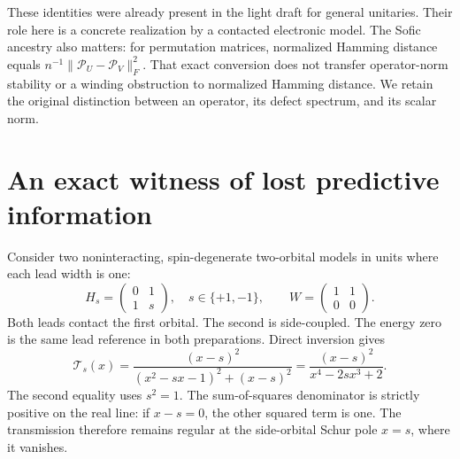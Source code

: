 \documentclass[11pt]{article}
\begin{document}
These identities were already present in the light draft for general unitaries. Their role here is a concrete realization by a contacted electronic model. The Sofic ancestry also matters: for permutation matrices, normalized Hamming distance equals $n^{-1}\|\mathcal P_U-\mathcal P_V\|_F^2$. That exact conversion does not transfer operator-norm stability or a winding obstruction to normalized Hamming distance. We retain the original distinction between an operator, its defect spectrum, and its scalar norm.

\section{An exact witness of lost predictive information}
Consider two noninteracting, spin-degenerate two-orbital models in units where each lead width is one:
\begin{equation}
H_s=\begin{pmatrix}0&1\\1&s\end{pmatrix},\quad s\in\{+1,-1\},\qquad
W=\begin{pmatrix}1&1\\0&0\end{pmatrix}.
\label{eq:twins}
\end{equation}
Both leads contact the first orbital. The second is side-coupled. The energy zero is the same lead reference in both preparations. Direct inversion gives
\begin{equation}
\mathcal T_s(x)=\frac{(x-s)^2}{(x^2-sx-1)^2+(x-s)^2}
=\frac{(x-s)^2}{x^4-2sx^3+2}.
\label{eq:twinT}
\end{equation}
The second equality uses $s^2=1$. The sum-of-squares denominator is strictly positive on the real line: if $x-s=0$, the other squared term is one. The transmission therefore remains regular at the side-orbital Schur pole $x=s$, where it vanishes.
\end{document}
